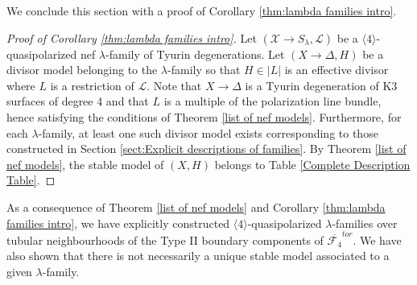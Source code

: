 \documentclass[a4paper]{amsart}
\theoremstyle{definition}
\theoremstyle{plain}
\theoremstyle{remark}
\begin{document}
We conclude this section with a proof of Corollary \ref{thm:lambda families intro}.

\begin{proof}[Proof of Corollary \ref{thm:lambda families intro}]

Let $(\mathcal{X}\rightarrow S_{\lambda},\mathcal{L})$ be a $\langle 4 \rangle$-quasipolarized nef $\lambda$-family of Tyurin degenerations. Let $(X\rightarrow \Delta,H)$ be a divisor model belonging to the $\lambda$-family so that $H\in|L|$ is an effective divisor where $L$ is a restriction of $\mathcal{L}$. Note that $X\rightarrow\Delta$ is a Tyurin degeneration of K3 surfaces of degree 4 and that $L$ is a multiple of the polarization line bundle, hence satisfying the conditions of Theorem \ref{list of nef models}. Furthermore, for each $\lambda$-family, at least one such divisor model exists corresponding to those constructed in Section \ref{sect:Explicit descriptions of families}. By Theorem \ref{list of nef models}, the stable model of $(X,H)$ belongs to Table \ref{Complete Description Table}.
\end{proof}

As a consequence of Theorem \ref{list of nef models} and Corollary \ref{thm:lambda families intro}, we have explicitly constructed $\langle 4 \rangle$-quasipolarized $\lambda$-families over tubular neighbourhoods of the Type II boundary components of $\overline{\mathcal{F}_4}^{tor}$. We have also shown that there is not necessarily a unique stable model associated to a given $\lambda$-family.


\end{document}
